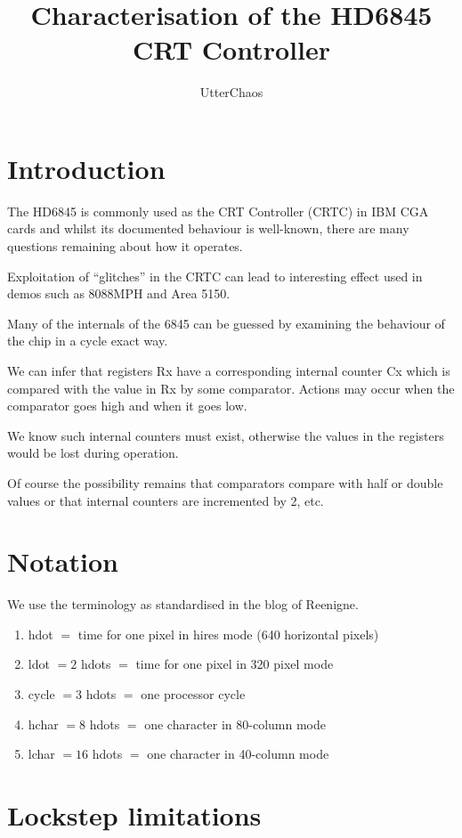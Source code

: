 \documentclass[a4paper,10pt]{amsart}
\title{Characterisation of the HD6845 CRT Controller}
\author{UtterChaos}
\begin{document}
\maketitle

\section{Introduction}

The HD6845 is commonly used as the CRT Controller (CRTC) in IBM CGA cards and
whilst its documented behaviour is well-known, there are many questions
remaining about how it operates.

Exploitation of ``glitches'' in the CRTC can lead to interesting effect used
in demos such as 8088MPH and Area 5150.

Many of the internals of the 6845 can be guessed by examining the behaviour of
the chip in a cycle exact way.

We can infer that registers Rx have a corresponding internal counter Cx which
is compared with the value in Rx by some comparator. Actions may occur when
the comparator goes high and when it goes low.

We know such internal counters must exist, otherwise the values in the
registers would be lost during operation.

Of course the possibility remains that comparators compare with half or
double values or that internal counters are incremented by 2, etc.

\section{Notation}

We use the terminology as standardised in the blog of Reenigne.

\begin{enumerate}
\item hdot $=$ time for one pixel in hires mode (640 horizontal pixels)
\item ldot $= 2$ hdots $=$ time for one pixel in 320 pixel mode 
\item cycle $= 3$ hdots $=$ one processor cycle
\item hchar $= 8$ hdots $=$ one character in 80-column mode
\item lchar $= 16$ hdots $=$ one character in 40-column mode
\end{enumerate}

\section{Lockstep limitations}
\end{document}
